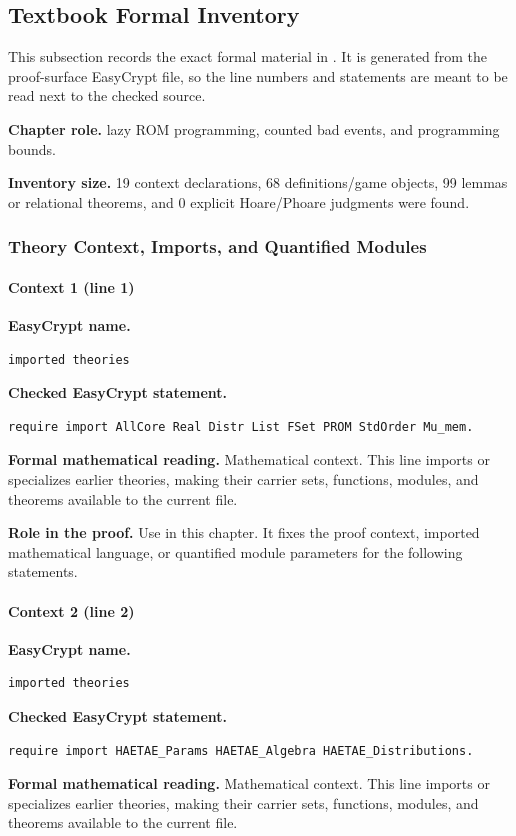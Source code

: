 \subsection*{Textbook Formal Inventory}
This subsection records the exact formal material in .  It is generated from the proof-surface EasyCrypt file, so the line numbers and statements are meant to be read next to the checked source.

\noindent\textbf{Chapter role.} lazy ROM programming, counted bad events, and programming bounds.

\noindent\textbf{Inventory size.} 19 context declarations, 68 definitions/game objects, 99 lemmas or relational theorems, and 0 explicit Hoare/Phoare judgments were found.

\subsubsection*{Theory Context, Imports, and Quantified Modules}
\paragraph{Context 1 (line 1)}
\noindent\textbf{EasyCrypt name.}
\begin{lstlisting}[language=EasyCrypt,basicstyle=\ttfamily\scriptsize]
imported theories
\end{lstlisting}
\noindent\textbf{Checked EasyCrypt statement.}
\begin{lstlisting}[language=EasyCrypt,basicstyle=\ttfamily\scriptsize]
require import AllCore Real Distr List FSet PROM StdOrder Mu_mem.
\end{lstlisting}
\noindent\textbf{Formal mathematical reading.}
Mathematical context. This line imports or specializes earlier theories, making their carrier sets, functions, modules, and theorems available to the current file.

\noindent\textbf{Role in the proof.}
Use in this chapter. It fixes the proof context, imported mathematical language, or quantified module parameters for the following statements.

\paragraph{Context 2 (line 2)}
\noindent\textbf{EasyCrypt name.}
\begin{lstlisting}[language=EasyCrypt,basicstyle=\ttfamily\scriptsize]
imported theories
\end{lstlisting}
\noindent\textbf{Checked EasyCrypt statement.}
\begin{lstlisting}[language=EasyCrypt,basicstyle=\ttfamily\scriptsize]
require import HAETAE_Params HAETAE_Algebra HAETAE_Distributions.
\end{lstlisting}
\noindent\textbf{Formal mathematical reading.}
Mathematical context. This line imports or specializes earlier theories, making their carrier sets, functions, modules, and theorems available to the current file.

